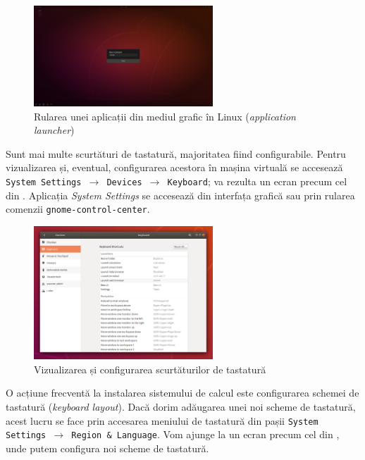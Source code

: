 \begin{figure}[!htbp]
  \centering
  \includegraphics[width=0.6\textwidth]{chapters/01-ui/img/alt+f2.png}
  \caption{Rularea unei aplicații din mediul grafic în Linux (\textit{application launcher})}
  \label{fig:ui:app-launcher}
\end{figure}

Sunt mai multe scurtături de tastatură, majoritatea fiind configurabile. Pentru vizualizarea și, eventual, configurarea acestora în mașina virtuală se accesează \texttt{System Settings $\rightarrow$ Devices $\rightarrow$ Keyboard}; va rezulta un ecran precum cel din . Aplicația \textit{System Settings} se accesează din interfața grafică sau prin rularea comenzii \texttt{gnome-control-center}.

\begin{figure}[!htbp]
  \centering
  \includegraphics[width=0.6\textwidth]{chapters/01-ui/img/keyboard-shortcuts.png}
  \caption{Vizualizarea și configurarea scurtăturilor de tastatură}
  \label{fig:ui:keyboard-shortcuts}
\end{figure}

O acțiune frecventă la instalarea sistemului de calcul este configurarea schemei de tastatură (\textit{keyboard layout}). Dacă dorim adăugarea unei noi scheme de tastatură, acest lucru se face prin accesarea meniului de tastatură din pașii \texttt{System Settings $\rightarrow$ Region \& Language}. Vom ajunge la un ecran precum cel din , unde putem configura noi scheme de tastatură.

